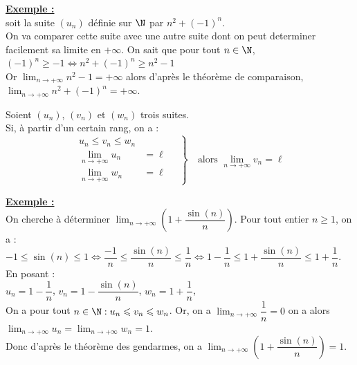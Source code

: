 \documentclass[11pt,twoside, openany]{extbook}
\begin{document}
\medskip
 \noindent \textbf{\ul{Exemple :}}\\
 soit la suite $(u_n)$ définie sur $\N$ par $n^2+(-1)^n$.\\
 On va comparer cette suite avec une autre suite dont on peut determiner facilement sa limite en $+\infty$.
 On sait que pour tout $n \in \N$, $(-1)^n \geq -1 \iff n^2+(-1)^n \geq n^2-1  $ \\ Or $\displaystyle \lim_{n \to +\infty} n^2-1 = +\infty$  alors d'après le théorème de comparaison, $\displaystyle \lim_{n \to +\infty} n^2+(-1)^n = +\infty$.



\begin{trm}
 Soient $(u_n)$, $(v_n)$ et $(w_n)$ trois suites.\\
 Si, à partir d'un certain rang, on a :\begin{equation*}
	\left.
	\begin{aligned}
         u_n \leqslant v_n \leqslant w_n \\
		\lim\limits_{n \rightarrow +\infty} u_n &= \ell \quad \\
		\lim\limits_{n \rightarrow +\infty} w_n &= \ell 
	\end{aligned}
	\right\}
	\quad \text{alors $\lim\limits_{n \rightarrow +\infty} v_n=\ell $}
\end{equation*}
\end{trm}
\medskip
 \noindent \textbf{\ul{Exemple :}}\\On cherche à déterminer $\displaystyle \lim_{n \to +\infty} \left( 1+  \dfrac{\sin(n)}{n} \right)$. Pour tout entier $n \geqslant 1$, on a :\\

$-1 \leqslant \sin(n) \leqslant 1 \iff \dfrac{-1}{n} \leqslant \dfrac{\sin(n)}{n} \leqslant \dfrac{1}{n} \iff 1-\dfrac{1}{n} \leqslant   1+  \dfrac{\sin(n)}{n}  \leqslant 1+\dfrac{1}{n}$.\medskip \\
En posant : \\
\hspace*{2cm} $u_n=1-\dfrac{1}{n}$, \qquad
 $v_n=1-\dfrac{\sin(n)}{n}$, \qquad
$ w_n= 1+\dfrac{1}{n}$, \qquad \\

On a pour tout $n \in \N : u_n \leqslant v_n \leqslant w_n$. Or, on a $\displaystyle \lim_{n \to +\infty} \dfrac{1}{n}= 0$ on a alors 
$\displaystyle \lim_{n\to +\infty} u_n=\displaystyle \lim_{n\to +\infty} w_n=1$.
\vspace{0.3em}\\
Donc d'après le théorème des gendarmes, on a $\displaystyle \lim_{n \to +\infty} \left(1+\dfrac{\sin(n)}{n}\right)=1$.
\end{document}
